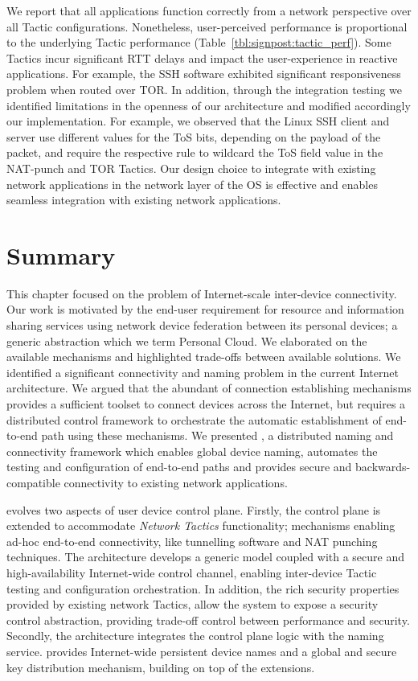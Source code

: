 We report that all applications function correctly from a network perspective
over all Tactic configurations. Nonetheless, user-perceived performance is
proportional to the underlying Tactic performance
(Table~\ref{tbl:signpost:tactic_perf}).  Some Tactics incur significant RTT
delays and impact the user-experience in reactive applications. For example, the
SSH software exhibited significant responsiveness problem when routed over
TOR\@. In addition, through the integration testing we identified limitations in
the openness of our architecture and modified accordingly our implementation.
For example, we observed that the Linux SSH client and server use different
values for the ToS bits, depending on the payload of the packet, and require the
respective \of rule to wildcard the ToS field value in the NAT-punch and TOR
Tactics. Our design choice to integrate \signpost with existing network
applications in the network layer of the OS is effective and enables seamless
integration with existing network applications.

\section{Summary} \label{sec:signpost-conclusion}

This chapter focused on the problem of Internet-scale inter-device connectivity.
Our work is motivated by the end-user requirement for resource and information
sharing services using network device federation between its personal devices; a
generic abstraction which we term Personal Cloud. We elaborated on the available
mechanisms and highlighted trade-offs between available solutions. We identified
a significant connectivity and naming problem in the current Internet
architecture.  We argued that the abundant of connection establishing mechanisms
provides a sufficient toolset to connect devices across the Internet, but
requires a distributed control framework to orchestrate the automatic
establishment of end-to-end path using these mechanisms. We presented \signpost,
a distributed naming and connectivity framework which enables global device
naming,  automates the testing and  configuration of end-to-end paths and
provides secure and backwards-compatible connectivity to existing network
applications. 

\signpost evolves two aspects of user device control plane. Firstly, the control
plane is extended to accommodate \textit{Network Tactics} functionality;
mechanisms enabling ad-hoc end-to-end connectivity, like tunnelling software and
NAT punching techniques. The architecture develops a generic model coupled with
a secure and high-availability Internet-wide control channel, enabling
inter-device Tactic testing and configuration orchestration.  In addition, the
rich security properties provided by existing network Tactics, allow the system
to expose a security control abstraction, providing trade-off control between
performance and security.  Secondly, the architecture integrates the control
plane logic with the naming service. \signpost provides Internet-wide
persistent device names and a global and secure key distribution mechanism,
building on top of the \dnssec extensions.

